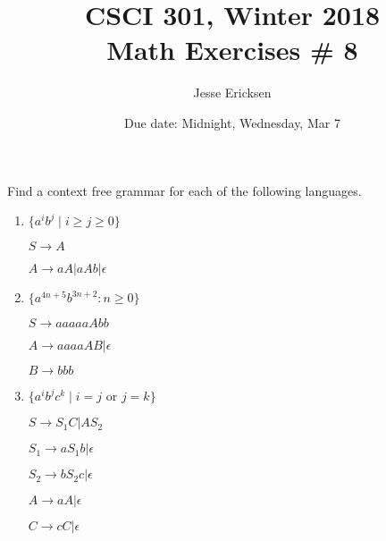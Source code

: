 \documentclass{article}
\title{CSCI 301, Winter 2018\\Math Exercises \# 8}
\author{Jesse Ericksen}
\date{Due date:  Midnight, Wednesday, Mar 7}
\begin{document}
\maketitle

\noindent
Find a context free grammar for each of the following languages.

\begin{enumerate}
\item
  $\{a^ib^j\mid i \geq j \geq 0\}$

\begin{center}
$S \rightarrow A$

$A \rightarrow aA|aAb|\epsilon$

\end{center}
\item
  $\{a^{4n+5}b^{3n+2}: n\geq 0\}$
  
  \begin{center}
$S \rightarrow aaaaaAbb$

$A \rightarrow aaaaAB|\epsilon$

$B \rightarrow bbb$

\end{center}

\item
  $\{a^ib^jc^k \mid i = j \mbox{ or } j = k\}$
  
  \begin{center}
$S \rightarrow S_1 C | A S_2$

$S_1 \rightarrow aS_1b |\epsilon$

$S_2 \rightarrow bS_2c |\epsilon$

$A \rightarrow aA | \epsilon$

$C \rightarrow cC | \epsilon$ 

\end{center}


\end{enumerate}
\end{document}
